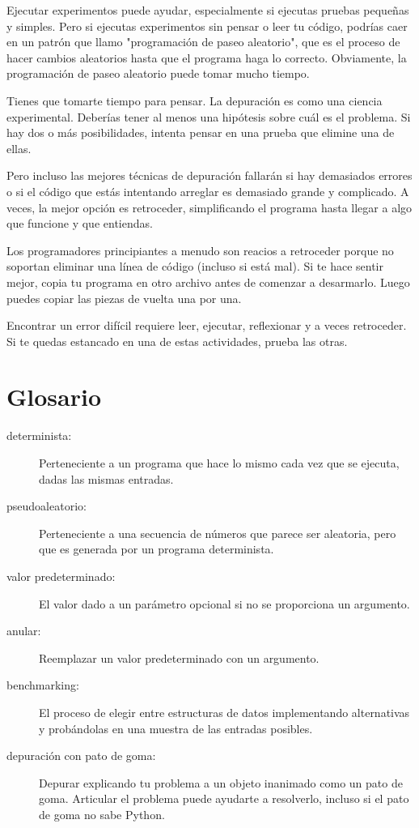 Ejecutar experimentos puede ayudar, especialmente si ejecutas pruebas pequeñas y simples. Pero si ejecutas experimentos sin pensar o leer tu código, podrías caer en un patrón que llamo "programación de paseo aleatorio", que es el proceso de hacer cambios aleatorios hasta que el programa haga lo correcto. Obviamente, la programación de paseo aleatorio puede tomar mucho tiempo.

Tienes que tomarte tiempo para pensar. La depuración es como una ciencia experimental. Deberías tener al menos una hipótesis sobre cuál es el problema. Si hay dos o más posibilidades, intenta pensar en una prueba que elimine una de ellas.

Pero incluso las mejores técnicas de depuración fallarán si hay demasiados errores o si el código que estás intentando arreglar es demasiado grande y complicado. A veces, la mejor opción es retroceder, simplificando el programa hasta llegar a algo que funcione y que entiendas.

Los programadores principiantes a menudo son reacios a retroceder porque no soportan eliminar una línea de código (incluso si está mal). Si te hace sentir mejor, copia tu programa en otro archivo antes de comenzar a desarmarlo. Luego puedes copiar las piezas de vuelta una por una.

Encontrar un error difícil requiere leer, ejecutar, reflexionar y a veces retroceder. Si te quedas estancado en una de estas actividades, prueba las otras.

\section{Glosario}

\begin{description}
    \item[determinista:] Perteneciente a un programa que hace lo mismo cada vez que se ejecuta, dadas las mismas entradas.
    
    \item[pseudoaleatorio:] Perteneciente a una secuencia de números que parece ser aleatoria, pero que es generada por un programa determinista.
    
    \item[valor predeterminado:] El valor dado a un parámetro opcional si no se proporciona un argumento.
    
    \item[anular:] Reemplazar un valor predeterminado con un argumento.
    
    \item[benchmarking:] El proceso de elegir entre estructuras de datos implementando alternativas y probándolas en una muestra de las entradas posibles.
    
    \item[depuración con pato de goma:] Depurar explicando tu problema a un objeto inanimado como un pato de goma. Articular el problema puede ayudarte a resolverlo, incluso si el pato de goma no sabe Python.
\end{description}

